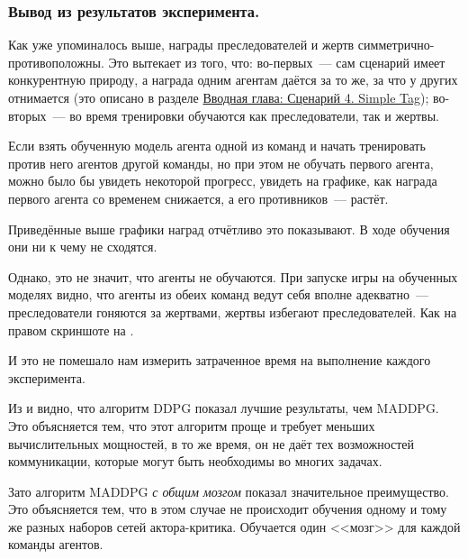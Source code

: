 \subsubsection{Вывод из результатов эксперимента.}

Как уже упоминалось выше, награды преследователей и жертв симметрично-противоположны. Это вытекает из того, что: во-первых~--- сам сценарий имеет конкурентную природу, а награда одним агентам даётся за то же, за что у других отнимается (это описано в разделе \hyperref[intro-st]{Вводная глава: Сценарий 4. Simple Tag}); во-вторых~--- во время тренировки обучаются как преследователи, так и жертвы.

Если взять обученную модель агента одной из команд и начать тренировать против него агентов другой команды, но при этом не обучать первого агента, можно было бы увидеть некоторой прогресс, увидеть на графике, как награда первого агента со временем снижается, а его противников~--- растёт.

Приведённые выше графики наград отчётливо это показывают. В ходе обучения они ни к чему не сходятся.

Однако, это не значит, что агенты не обучаются. При запуске игры на обученных моделях видно, что агенты из обеих команд ведут себя вполне адекватно~--- преследователи гоняются за жертвами, жертвы избегают преследователей. Как на правом скриншоте на .

И это не помешало нам измерить затраченное время на выполнение каждого эксперимента.

Из  и  видно, что алгоритм DDPG показал лучшие результаты, чем MADDPG. Это объясняется тем, что этот алгоритм проще и требует меньших вычислительных мощностей, в то же время, он не даёт тех возможностей коммуникации, которые могут быть необходимы во многих задачах.

Зато алгоритм MADDPG \textit{с общим мозгом} показал значительное преимущество. Это объясняется тем, что в этом случае не происходит обучения одному и тому же разных наборов сетей актора-критика. Обучается один <<мозг>> для каждой команды агентов.
